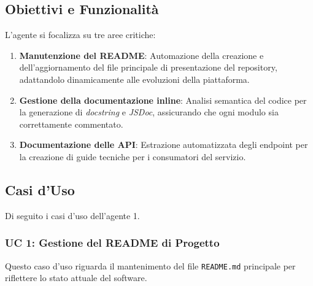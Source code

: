 \documentclass[12pt, a4paper]{article}
\begin{document}
\subsection{Obiettivi e Funzionalità}

L'agente si focalizza su tre aree critiche:

\begin{enumerate}

    \item \textbf{Manutenzione del README}: Automazione della creazione e dell'aggiornamento del file principale di presentazione del repository, adattandolo dinamicamente alle evoluzioni della piattaforma.

    \item \textbf{Gestione della documentazione inline}: Analisi semantica del codice per la generazione di \textit{docstring} e \textit{JSDoc}, assicurando che ogni modulo sia correttamente commentato.

    \item \textbf{Documentazione delle API}: Estrazione automatizzata degli endpoint per la creazione di guide tecniche per i consumatori del servizio.

\end{enumerate}


\subsection{Casi d'Uso}
Di seguito i casi d'uso dell'agente 1.
\subsubsection{UC 1: Gestione del README di Progetto}
Questo caso d'uso riguarda il mantenimento del file \texttt{README.md} principale per riflettere lo stato attuale del software.
\end{document}
